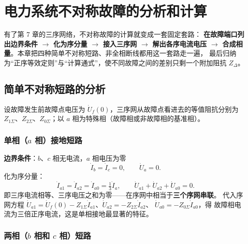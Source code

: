 ﻿%

\chapter{电力系统不对称故障的分析和计算}

有了第 7 章的三序网络，不对称故障的计算就变成一套固定套路：
\textbf{在故障端口列出边界条件 $\to$ 化为序分量 $\to$ 接入三序网 $\to$ 解出各序电流电压
$\to$ 合成相量}。本章把四种简单不对称短路、非全相断线都用这一套路走一遍，
最后归纳为“正序等效定则”与“计算通式”，使不同故障之间的差别只剩一个附加阻抗 $Z_\Delta$。

\section{简单不对称短路的分析}

设故障发生前故障点电压为 $\dot U_f(0)$，三序网从故障点看进去的等值阻抗分别为
$Z_{1\Sigma}$、$Z_{2\Sigma}$、$Z_{0\Sigma}$；以 $a$ 相为特殊相（故障相或非故障相的基准相）。

\subsection{单相（$a$ 相）接地短路}

\textbf{边界条件}：$b$、$c$ 相无电流，$a$ 相电压为零
\begin{equation}
  \dot I_b=\dot I_c=0,\qquad \dot U_a=0 .
\end{equation}
化为序分量：
\begin{equation}
  \dot I_{a1}=\dot I_{a2}=\dot I_{a0}=\tfrac{1}{3}\dot I_a,
  \qquad \dot U_{a1}+\dot U_{a2}+\dot U_{a0}=0 .
\end{equation}
即三序电流相等、三序电压之和为零——在序网中相当于\textbf{三个序网串联}。
代入序网方程
$\dot U_{a1}=\dot U_f(0)-Z_{1\Sigma}\dot I_{a1}$、$\dot U_{a2}=-Z_{2\Sigma}\dot I_{a2}$、
$\dot U_{a0}=-Z_{0\Sigma}\dot I_{a0}$，得
故障相电流为三倍正序电流，这是单相接地最显著的特征。

\subsection{两相（$b$ 相和 $c$ 相）短路}

